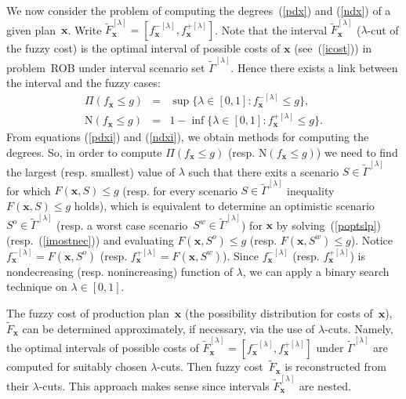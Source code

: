 \documentclass[11pt]{article}
\begin{document}
We now consider the problem of computing
the degrees~(\ref{pdx}) and (\ref{ndx})
 of a given plan~$\pmb{x}$. 
 Write $\widetilde{F}_{\pmb{x}}^{[\lambda]}=
[f^{-[\lambda]}_{\pmb{x}},f^{+[\lambda]}_{\pmb{x}}]$. Note that the interval $\widetilde{F}_{\pmb{x}}^{[\lambda]}$
($\lambda$-cut of the fuzzy cost) is the optimal 
interval of possible costs of $\pmb{x}$ (see~(\ref{icost}))
in problem~\textsc{ROB} under interval scenario set $\widetilde{\Gamma}^{[\lambda]}$.
Hence there exists a link between the interval and the fuzzy cases:
\begin{eqnarray}
\Pi(f_{\pmb{x}}\leq g)&=&
\sup\{\lambda\in [0,1]: f^{-[\lambda]}_{\pmb{x}}\leq g\},\label{pdxi}\\
\mathrm{N}(f_{\pmb{x}}\leq g)&=&1-\inf\{\lambda
	\in[0,1]:   f^{+[\lambda]}_{\pmb{x}}\leq g\}.\label{ndxi}
\end{eqnarray}
From equations  (\ref{pdxi}) and (\ref{ndxi}), we obtain methods for
computing the degrees. 
So, in order 
to compute 
$\Pi(f_{\pmb{x}}\leq g)$ (resp. $\mathrm{N}(f_{\pmb{x}}\leq g)$)
we need to find the largest  (resp. smallest) value of $\lambda$ such that
there exits a scenario $S\in \widetilde{\Gamma}^{[\lambda]}$ for which $F(\pmb{x},S)\leq g$
(resp. 
for every scenario $S\in \widetilde{\Gamma}^{[\lambda]}$ inequality $F(\pmb{x},S)\leq g$ holds),
which is equivalent to
determine an optimistic scenario $S^{o}\in \widetilde{\Gamma}^{[\lambda]}$ 
(resp. a worst 
case scenario~$S^{w}\in \widetilde{\Gamma}^{[\lambda]}$)
for $\pmb{x}$
by solving~(\ref{poptslp}) (resp.~(\ref{imostnec})) and
evaluating $F(\pmb{x},S^{o})\leq g$
(resp. $F(\pmb{x},S^{w})\leq g$). Notice $f^{-[\lambda]}_{\pmb{x}}=F(\pmb{x},S^{o})$
(resp. $f^{+[\lambda]}_{\pmb{x}}=F(\pmb{x},S^{w})$).
Since $f^{-[\lambda]}_{\pmb{x}}$  (resp. $f^{+[\lambda]}_{\pmb{x}}$) is nondecreasing 
(resp. nonincreasing)
function
of $\lambda$,
we can apply a binary search technique on $\lambda \in [0,1]$.

The fuzzy cost of production plan~$\pmb{x}$ 
(the possibility distribution for costs of~$\pmb{x}$), $\widetilde{F}_{\pmb{x}}$
can be determined approximately, if necessary,
via the use of $\lambda$-cuts. Namely, 
the optimal intervals of possible costs of $\widetilde{F}^{[\lambda]}_{\pmb{x}}=
[f^{-[\lambda]}_{\pmb{x}}, f^{+[\lambda]}_{\pmb{x}}]$ under $\widetilde{\Gamma}^{[\lambda]}$
are computed for
suitably chosen $\lambda$-cuts.
Then  fuzzy cost~$\widetilde{F}_{\pmb{x}}$ is reconstructed from their
$\lambda$-cuts. This
approach makes sense since intervals $\widetilde{F}^{[\lambda]}_{\pmb{x}}$ are nested.
\end{document}
